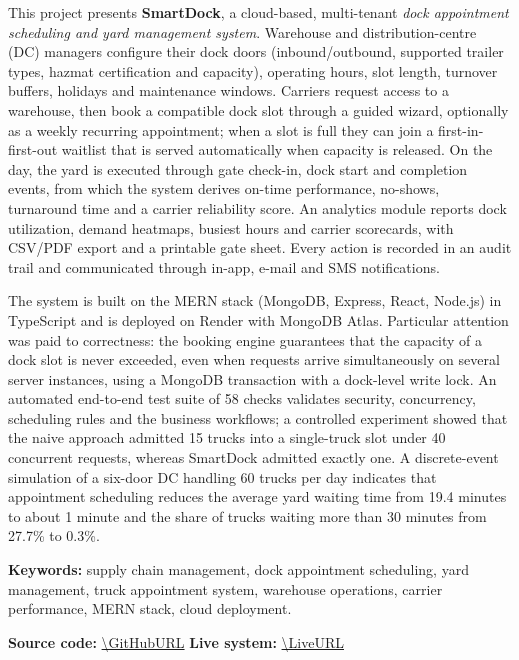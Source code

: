 This project presents \textbf{SmartDock}, a cloud-based, multi-tenant \emph{dock appointment scheduling and yard management system}. Warehouse and distribution-centre (DC) managers configure their dock doors (inbound/outbound, supported trailer types, hazmat certification and capacity), operating hours, slot length, turnover buffers, holidays and maintenance windows. Carriers request access to a warehouse, then book a compatible dock slot through a guided wizard, optionally as a weekly recurring appointment; when a slot is full they can join a first-in-first-out waitlist that is served automatically when capacity is released. On the day, the yard is executed through gate check-in, dock start and completion events, from which the system derives on-time performance, no-shows, turnaround time and a carrier reliability score. An analytics module reports dock utilization, demand heatmaps, busiest hours and carrier scorecards, with CSV/PDF export and a printable gate sheet. Every action is recorded in an audit trail and communicated through in-app, e-mail and SMS notifications.

The system is built on the MERN stack (MongoDB, Express, React, Node.js) in TypeScript and is deployed on Render with MongoDB Atlas. Particular attention was paid to correctness: the booking engine guarantees that the capacity of a dock slot is never exceeded, even when requests arrive simultaneously on several server instances, using a MongoDB transaction with a dock-level write lock. An automated end-to-end test suite of 58 checks validates security, concurrency, scheduling rules and the business workflows; a controlled experiment showed that the naive approach admitted 15 trucks into a single-truck slot under 40 concurrent requests, whereas SmartDock admitted exactly one. A discrete-event simulation of a six-door DC handling 60 trucks per day indicates that appointment scheduling reduces the average yard waiting time from 19.4 minutes to about 1 minute and the share of trucks waiting more than 30 minutes from 27.7\% to 0.3\%.

\vspace{0.5cm}
\noindent\textbf{Keywords:} supply chain management, dock appointment scheduling, yard management, truck appointment system, warehouse operations, carrier performance, MERN stack, cloud deployment.

\vspace{0.5cm}
\noindent\textbf{Source code:} \url{\GitHubURL} \quad \textbf{Live system:} \url{\LiveURL}
